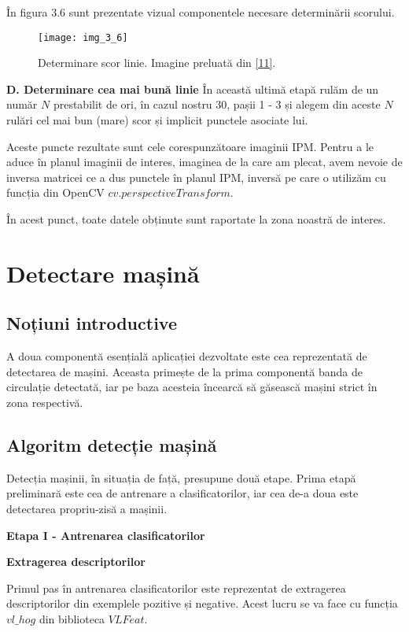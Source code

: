 În figura 3.6 sunt prezentate vizual componentele necesare determinării scorului.
\begin{figure}[!h]
	\centering
	\texttt{[image: img\_3\_6]}
	\caption[Determinare scor linie]{Determinare scor linie. Imagine preluată din \hyperlink{MohamedAly}{[11]}.}
\end{figure}

\textbf{D. Determinare cea mai bună linie}
În această ultimă etapă rulăm de un număr $N$ prestabilit de ori, în cazul nostru 30, pașii 1 - 3 și alegem din aceste $N$ rulări cel mai bun (mare) scor și implicit punctele asociate lui.

Aceste puncte rezultate sunt cele corespunzătoare imaginii IPM. Pentru a le aduce în planul imaginii de interes, imaginea de la care am plecat, avem nevoie de inversa matricei ce a dus punctele în planul IPM, inversă pe care o utilizăm cu funcția din OpenCV $cv.perspectiveTransform$. 

În acest punct, toate datele obținute sunt raportate la zona noastră de interes.

\section{Detectare mașină}
\subsection*{Noțiuni introductive}

A doua componentă esențială aplicației dezvoltate este cea reprezentată de detectarea de mașini. Aceasta primește de la prima componentă banda de circulație detectată, iar pe baza acesteia încearcă să găsească mașini strict în zona respectivă.

\subsection*{Algoritm detecție mașină}
Detecția mașinii, în situația de față, presupune două etape. Prima etapă preliminară este cea de antrenare a clasificatorilor, iar cea de-a doua este detectarea propriu-zisă a mașinii.

\textbf{Etapa I - Antrenarea clasificatorilor}

\textbf{Extragerea descriptorilor}

Primul pas în antrenarea clasificatorilor este reprezentat de extragerea descriptorilor din exemplele pozitive și negative. 
Acest lucru se va face cu funcția $vl\_hog$ din biblioteca $VLFeat$. 

